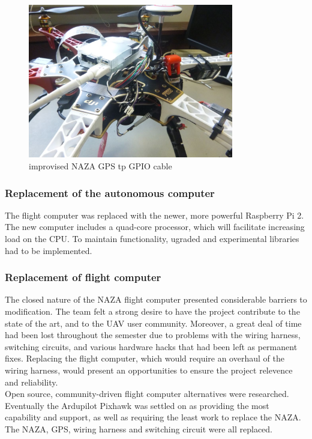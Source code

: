 \documentclass[a4paper, 12pt, titlepage]{article}
\begin{document}
\begin{figure}[h!]
\includegraphics[width=0.8\textwidth]{NAZAGPS.JPG}
\centering
\caption{improvised NAZA GPS tp GPIO cable}
\end{figure}


		\subsubsection{Replacement of the autonomous computer}
The flight computer was replaced with the newer, more powerful Raspberry Pi 2. The new computer includes a quad-core processor, which will facilitate increasing load on the CPU. To maintain functionality, ugraded and experimental libraries had to be implemented.

		\subsubsection{Replacement of flight computer}
The closed nature of the NAZA flight computer presented considerable barriers to modification. The team felt a strong desire to have the project contribute to the state of the art, and to the UAV user community. Moreover, a great deal of time had been lost throughout the semester due to problems with the wiring harness, switching circuits, and various hardware hacks that had been left as permanent fixes. Replacing the flight computer, which would require an overhaul of the wiring harness, would present an opportunities to ensure the project relevence and reliability.
\\Open source, community-driven flight computer alternatives were researched. Eventually the Ardupilot Pixhawk was settled on as providing the most capability and support, as well as requiring the least work to replace the NAZA. The NAZA, GPS, wiring harness and switching circuit were all replaced.
\end{document}
